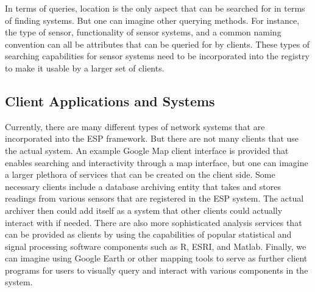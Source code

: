 In terms of queries, location is the only aspect that can be
searched for in terms of finding systems.  But one can imagine other
querying methods.  For instance, the type of sensor, functionality of
sensor systems, and a common naming convention can all be attributes
that can be queried for by clients.  These types of searching
capabilities for sensor systems need to be incorporated into the
registry to make it usable by a larger set of clients.

\subsection{Client Applications and Systems} 

Currently, there are many different types of network systems
that are incorporated into the ESP framework.  But there are not many
clients that use the actual system.  An example Google Map client
interface is provided that enables searching and 
interactivity through a map interface, but one can imagine a larger
plethora of services that can be created on the client side.  Some
necessary clients include a database archiving entity that takes and
stores readings from various sensors that are registered in the ESP
system.  The actual archiver then could add itself as a system
that other clients could actually interact with if needed.  There are
also more sophisticated analysis services that can be provided as
clients by using the capabilities of popular statistical and signal processing 
software components such as R, ESRI, and Matlab.  Finally, we can imagine
using Google Earth or other mapping tools to serve as
further client programs for users to visually query and interact with
various components in the system.

